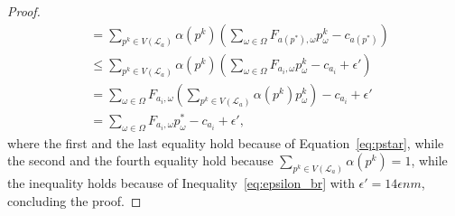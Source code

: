 \begin{proof}
\begin{align*}
     & = \sum_{p^k \in V(\mathcal{L}_{a}) } \alpha(p^k) \left( \sum_{\omega  \in \Omega }  F_{a(p^*),\omega} p^{k}_\omega - c_{a(p^*)} \right) \\
     & \le \sum_{p^k \in V(\mathcal{L}_{a}) } \alpha(p^k) \left( \sum_{\omega  \in \Omega }  F_{a_i,\omega} p^{k}_\omega - c_{a_i} + \epsilon' \right)    \\
     & =  \sum_{\omega  \in \Omega }  F_{a_{i},\omega} \left( \sum_{p^k \in V(\mathcal{L}_{a}) } \alpha(p^{k}) p^{k}_\omega \right) - c_{a_{i}} + \epsilon'\\
     & =  \sum_{\omega  \in \Omega }  F_{a_{i},\omega} p^{*}_\omega  - c_{a_{i}} + \epsilon',
 \end{align*}
where the first and the last equality hold because of Equation~\ref{eq:pstar}, while the second and the fourth equality hold because $\sum_{p^{k} \in V(\mathcal{L}_{a})} \alpha(p^{k}) = 1$, while the inequality holds because of Inequality~\ref{eq:epsilon_br} with $\epsilon'= 14 \epsilon n m$, concluding the proof.
\end{proof}


